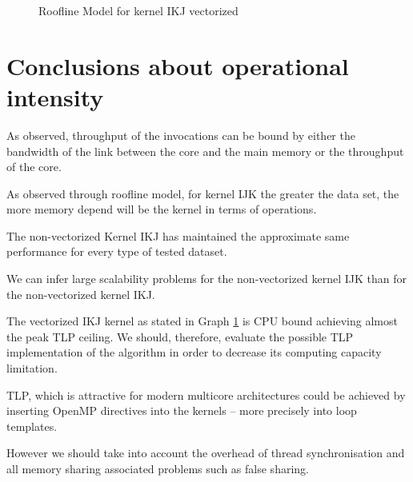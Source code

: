 \documentclass{sigplanconf}
\begin{document}
\begin{figure}[H]
\caption{Roofline Model for kernel IKJ vectorized}
\label{figure:roofline_vetor_points}
\end{figure}

\section{Conclusions about operational intensity}
As observed, throughput of the invocations can be bound by either the
bandwidth of the link between the core and the main memory or the throughput of the core. \par 
As observed through roofline model, for kernel IJK the greater the data set, the more memory depend will be the kernel in terms of operations.
\par The non-vectorized Kernel IKJ has maintained the approximate same performance for every type of tested dataset.\par
We can infer large scalability problems for the non-vectorized kernel IJK than for the non-vectorized kernel IKJ. \par 
The vectorized IKJ kernel as stated in Graph \ref{figure:roofline_vetor_points} is CPU bound achieving almost the peak TLP ceiling. We should, therefore, evaluate the possible TLP implementation of the algorithm in order to decrease its computing capacity limitation.\par 
TLP, which is attractive for modern multicore architectures could be achieved by inserting OpenMP directives into the kernels -- more precisely into loop templates. \par However we should take into account the overhead of thread synchronisation and all memory sharing associated problems such as false sharing.
\end{document}

